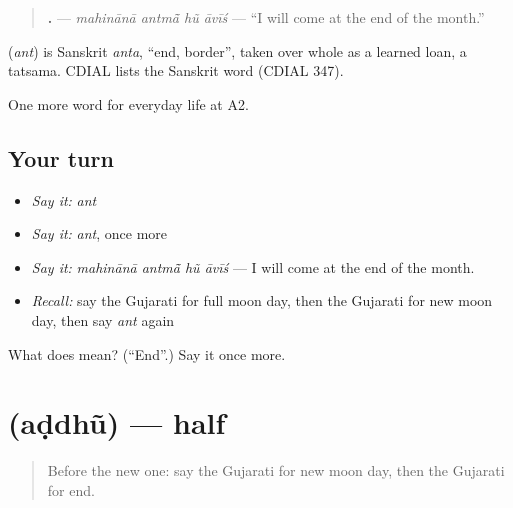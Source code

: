 \begin{quote}
\textbf{   .} — \emph{mahinānā antmā̃ hũ āvīś} — \textquotedblleft{}I will come at the end of the month.\textquotedblright{}
\end{quote}

\begin{cousinweb}
\textbf{} (\emph{ant}) is Sanskrit \emph{anta}, \textquotedblleft{}end, border\textquotedblright{}, taken over whole as a learned loan, a tatsama. CDIAL lists the Sanskrit word (CDIAL 347).
\end{cousinweb}

\begin{grammarlens}[title={What you've built}]
One more word for everyday life at A2.
\end{grammarlens}

\subsection*{Your turn}
\begin{itemize}
\raggedright
  \item \emph{Say it:} \emph{ant}
  \item \emph{Say it:} \emph{ant}, once more
  \item \emph{Say it:} \emph{mahinānā antmā̃ hũ āvīś} — I will come at the end of the month.
  \item \emph{Recall:} say the Gujarati for full moon day, then the Gujarati for new moon day, then say \emph{ant} again
\end{itemize}

\begin{tcolorbox}[breakable,colback=teal!4,colframe=teal!35!black,title={Before you move on}]
What does  mean? (\textquotedblleft{}End\textquotedblright{}.) Say it once more.
\end{tcolorbox}
\section[\texorpdfstring{\gu{અડધું} (aḍdhũ)}{અડધું (aḍdhũ)}]{ (aḍdhũ) — half}

\label{lesson:GU-C175-addhu}



\begin{quote}
Before the new one: say the Gujarati for new moon day, then the Gujarati for end.
\end{quote}

